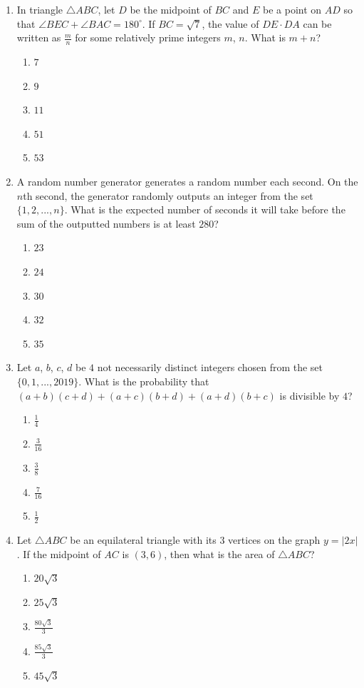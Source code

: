 \documentclass[12pt]{scrartcl}
\begin{document}
\begin{enumerate}
\item In triangle $\triangle ABC$, let $D$ be the midpoint of $BC$ and $E$ be a point on $AD$ so that $\angle BEC+\angle BAC=180^{\circ}$. If $BC=\sqrt{7}$, the value of $DE \cdot DA$ can be written as $\frac{m}{n}$ for some relatively prime integers $m$, $n$. What is $m+n$?
\begin{enumerate}
    \item $7$
    \item $9$
    \item $11$
    \item $51$
    \item $53$
\end{enumerate}

\item A random number generator generates a random number each second. On the $n$th second, the generator randomly outputs an integer from the set $\{1,2,..., n\}$. What is the expected number of seconds it will take before the sum of the outputted numbers is at least $280$?
\begin{enumerate}
    \item $23$
    \item $24$
    \item $30$
    \item $32$
    \item $35$
\end{enumerate}

\item Let $a$, $b$, $c$, $d$ be $4$ not necessarily distinct integers chosen from the set $\{0,1,..., 2019\}$. What is the probability that $(a+b)(c+d)+(a+c)(b+d)+(a+d)(b+c)$ is divisible by $4$?
\begin{enumerate}
    \item $\frac{1}{4}$
    \item $\frac{3}{16}$
    \item $\frac{3}{8}$
    \item $\frac{7}{16}$
    \item $\frac{1}{2}$
\end{enumerate}

\item Let $\triangle ABC$ be an equilateral triangle with its $3$ vertices on the graph $y=|2x|$. If the midpoint of $AC$ is $(3,6)$, then what is the area of $\triangle ABC$?
\begin{enumerate}
    \item $20\sqrt{3}$
    \item $25\sqrt{3}$
    \item $\frac{80\sqrt{3}}{3}$
    \item $\frac{85\sqrt{3}}{3}$
    \item $45\sqrt{3}$
\end{enumerate}


\end{enumerate}
\end{document}
